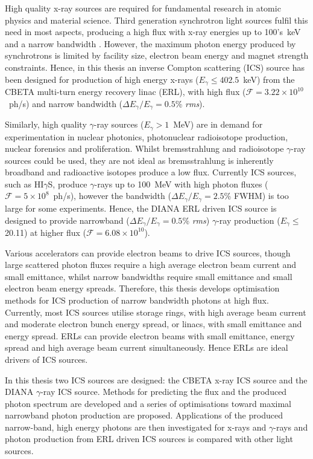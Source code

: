 \documentclass[11pt,oneside]{thesisformat}
\begin{document}
High quality x-ray sources are required for fundamental research in atomic physics and material science. Third generation synchrotron light sources fulfil this need in most aspects, producing a high flux with x-ray energies up to 100's~\si{\kilo\electronvolt} and a narrow bandwidth . However, the maximum photon energy produced by synchrotrons is limited by facility size, electron beam energy and magnet strength constraints. Hence, in this thesis an inverse Compton scattering (ICS) source has been designed for production of high energy x-rays ($E_{\gamma} \leq 402.5$~\si{\kilo\electronvolt}) from the CBETA multi-turn energy recovery linac (ERL), with high flux ($\mathcal{F} = 3.22\times 10^{10}$~ph/\si{\second}) and narrow bandwidth ($\Delta E_{\gamma}/E_{\gamma} = 0.5$\% \textit{rms}).   

Similarly, high quality $\gamma$-ray sources ($E_{\gamma} > 1$~\si{\mega\electronvolt}) are in demand for experimentation in nuclear photonics, photonuclear radioisotope production, nuclear forensics and proliferation. Whilst bremsstrahlung and radioisotope $\gamma$-ray sources could be used, they are not ideal as bremsstrahlung is inherently broadband and radioactive isotopes produce a low flux. Currently ICS sources, such as HI$\gamma$S, produce $\gamma$-rays up to 100~\si{\mega\electronvolt} with high photon fluxes ($\mathcal{F}=5\times 10^{8}$~ph/\si{\second}), however the bandwidth ($\Delta E_{\gamma}/E_{\gamma} = 2.5$\% FWHM) is too large for some experiments. Hence, the DIANA ERL driven ICS source is designed to provide narrowband ($\Delta E_{\gamma}/E_{\gamma} = 0.5$\% \textit{rms}) $\gamma$-ray production ($E_{\gamma} \leq$ 20.11) at higher flux ($\mathcal{F} = 6.08\times 10^{10}$).  

Various accelerators can provide electron beams to drive ICS sources, though large scattered photon fluxes require a high average electron beam current and small emittance, whilst narrow bandwidths require small emittance and small electron beam energy spreads. Therefore, this thesis develops optimisation methods for ICS production of narrow bandwidth photons at high flux. Currently, most ICS sources utilise storage rings, with high average beam current and moderate electron bunch energy spread, or linacs, with small emittance and energy spread. ERLs can provide electron beams with small emittance, energy spread and high average beam current simultaneously. Hence ERLs are ideal drivers of ICS sources.      

In this thesis two ICS sources are designed: the CBETA x-ray ICS source and the DIANA $\gamma$-ray ICS source. Methods for predicting the flux and the produced photon spectrum are developed and a series of optimisations toward maximal narrowband photon production are proposed. Applications of the produced narrow-band, high energy photons are then investigated for x-rays and $\gamma$-rays and photon production from ERL driven ICS sources is compared with other light sources.   
\end{document}
